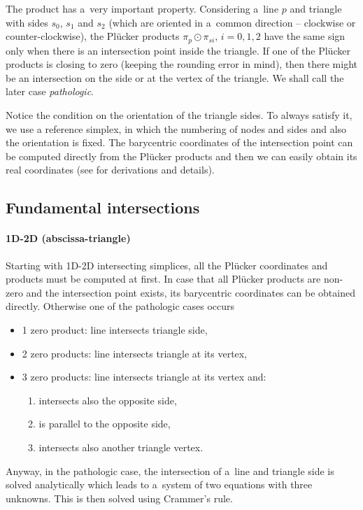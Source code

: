 \documentclass[dvipsnames,FM,Dis]{tulthesis}
\begin{document}
The product has a~very important property. Considering a~line $p$ and triangle with sides 
$s_0$, $s_1$ and $s_2$ (which are oriented in a~common direction -- clockwise or counter-clockwise), 
the Pl\"{u}cker products $\pi_p \odot \pi_{si},\, i=0,1,2$ have the same sign only when there
is an intersection point inside the triangle.
If one of the Pl\"{u}cker products is closing to zero (keeping the rounding error in mind), 
then there might be an intersection on the side 
or at the vertex of the triangle. We shall call the later case \emph{pathologic}.

Notice the condition on the orientation of the triangle sides. To always satisfy it, we use a
reference simplex, in which the numbering of nodes and sides and also the orientation is fixed.
The barycentric coordinates of the intersection point can be computed directly from the Pl\"{u}cker products
and then we can easily obtain its real coordinates (see \cite{fris_dp_2015} for derivations and details).

\subsection{Fundamental intersections}
\paragraph{1D-2D (abscissa-triangle)}
Starting with 1D-2D intersecting simplices, all the Pl\"{u}cker coordinates and products must be computed at first.
In case that all Pl\"{u}cker products are non-zero and the intersection point exists, its barycentric coordinates 
can be obtained directly. Otherwise one of the pathologic cases occurs
%
\begin{itemize}[itemsep=-3pt]
\item 1 zero product: line intersects triangle side,
\item 2 zero products: line intersects triangle at its vertex,
\item 3 zero products: line intersects triangle at its vertex and:
  \begin{enumerate}[label=\alph*), itemsep=-3pt]
    \item intersects also the opposite side,
    \item is parallel to the opposite side,
    \item intersects also another triangle vertex.
  \end{enumerate}
\end{itemize}
%
Anyway, in the pathologic case, the intersection of a~line and triangle side is solved analytically which leads
to a~system of two equations with three unknowns. This is then solved using Crammer's rule.
\end{document}
